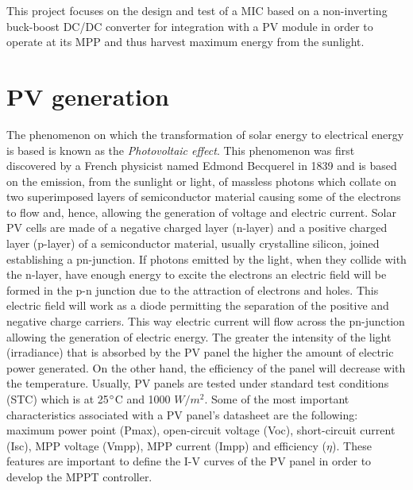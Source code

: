 This project focuses on the design and test of a MIC based on a non-inverting buck-boost DC/DC converter for integration with a PV module in order to operate at its MPP and thus harvest maximum energy from the sunlight. 

\section{PV generation}

The phenomenon on which the transformation of solar energy to electrical energy is based is known as the \textit{Photovoltaic effect}. This phenomenon was first discovered by a French physicist named Edmond Becquerel in 1839 and is based on the emission, from the sunlight or light, of massless photons which collate on two superimposed layers of semiconductor material causing some of the electrons to flow and, hence, allowing the generation of voltage and electric current. Solar PV cells are made of a negative charged layer (n-layer) and a positive charged layer (p-layer) of a semiconductor material, usually crystalline silicon, joined establishing a pn-junction. If photons emitted by the light, when they collide with the n-layer,  have enough energy to excite the electrons an electric field will be formed in the p-n junction due to the attraction of electrons and holes. This electric field will work as a diode permitting the separation of the positive and negative charge carriers.  This way electric current will flow across the pn-junction allowing the generation of electric energy. %
 The greater the intensity of the light (irradiance) that is absorbed by the PV panel the higher the amount of electric power generated. On the other hand, the efficiency of the panel will decrease with the temperature. Usually, PV panels are tested under standard test conditions (STC) which is at 25$\dec$C and 1000 $W/ m^2$. %
Some of the most important characteristics associated with a PV panel’s datasheet are the following: maximum power point (Pmax), open-circuit voltage (Voc), short-circuit current (Isc), MPP voltage (Vmpp), MPP current (Impp) and efficiency ($\eta$).  %
These features are important to define the I-V curves of the PV panel in order to develop the MPPT controller.

